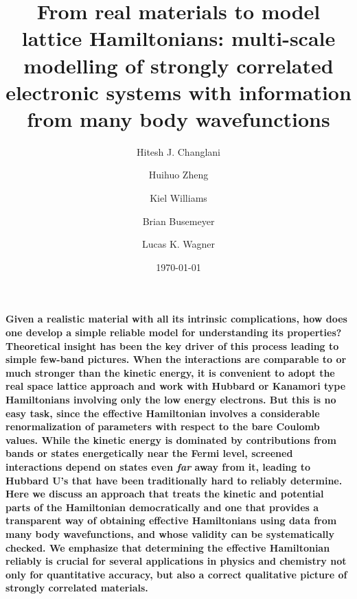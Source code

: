 \documentclass[prl,12pt,onecolumn,nofootinbib,notitlepage,english,superscriptaddress]{revtex4-1}
\begin{document}
\renewcommand{\thefootnote}{\fnsymbol{footnote}}
\renewcommand\abstractname{}
\title{From real materials to model lattice Hamiltonians: multi-scale modelling of strongly correlated electronic systems 
       with information from many body wavefunctions}

\author{Hitesh J. Changlani}
\author{Huihuo Zheng}
\author{Kiel Williams}
\author{Brian Busemeyer}
\author{Lucas K. Wagner}
\date{\today}
\maketitle

\textbf{
Given a realistic material with all its intrinsic complications, how does one develop a 
simple reliable model for understanding its properties? Theoretical insight has been the key driver of 
this process leading to simple few-band pictures. When the interactions are comparable 
to or much stronger than the kinetic energy, it is convenient to adopt the real space lattice 
approach and work with Hubbard or Kanamori type Hamiltonians involving only the low energy electrons. 
But this is no easy task, since the effective Hamiltonian involves a considerable renormalization of parameters with respect 
to the bare Coulomb values. While the kinetic energy is dominated by contributions from bands or states energetically 
near the Fermi level, screened interactions depend on states even \emph{far} away from it, leading to Hubbard U's 
that have been traditionally hard to reliably determine. 
Here we discuss an approach that treats the kinetic and potential parts of the Hamiltonian 
democratically and one that provides a transparent way of obtaining effective Hamiltonians using data from many body wavefunctions, 
and whose validity can be systematically checked.
We emphasize that determining the effective Hamiltonian reliably is crucial for 
several applications in physics and chemistry not only for quantitative accuracy, but also a 
correct qualitative picture of strongly correlated materials. 
}
\end{document}
